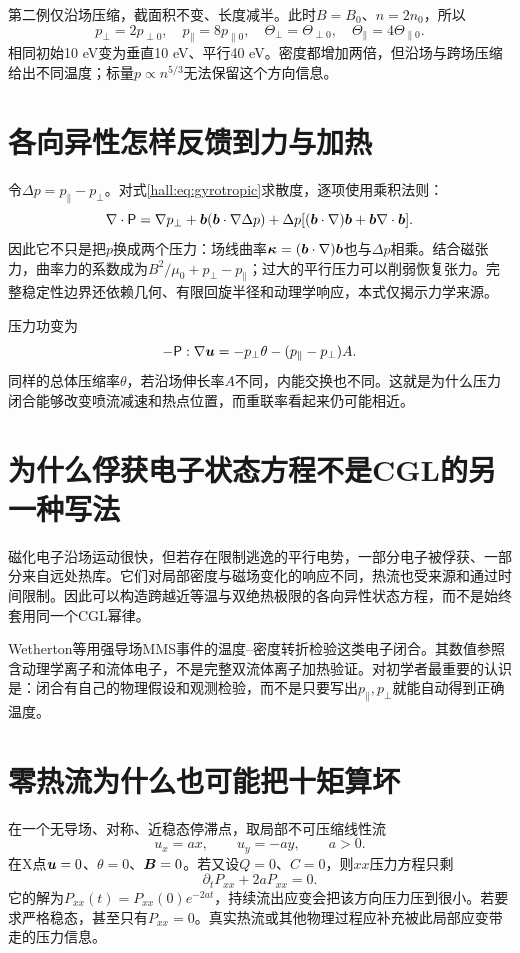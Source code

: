 第二例仅沿场压缩，截面积不变、长度减半。此时$B=B_0$、$n=2n_0$，所以
\begin{equation}
p_\perp=2p_{\perp0},\quad p_\parallel=8p_{\parallel0},\quad
\Theta_\perp=\Theta_{\perp0},\quad\Theta_\parallel=4\Theta_{\parallel0}.
\end{equation}
相同初始10 eV变为垂直10 eV、平行40 eV。密度都增加两倍，但沿场与跨场压缩给出不同温度；标量$p\propto n^{5/3}$无法保留这个方向信息。

\section{各向异性怎样反馈到力与加热}
令$\Delta p=p_\parallel-p_\perp$。对式\eqref{hall:eq:gyrotropic}求散度，逐项使用乘积法则：
\begin{equation}
\nabla\cdot\mathsf P=\nabla p_\perp
+\bm{b}(\bm{b}\cdot\nabla\Delta p)
+\Delta p[(\bm{b}\cdot\nabla)\bm{b}+\bm{b}\nabla\cdot\bm{b}].
\end{equation}
因此它不只是把$p$换成两个压力：场线曲率$\bm{\kappa}=(\bm{b}\cdot\nabla)\bm{b}$也与$\Delta p$相乘。结合磁张力，曲率力的系数成为$B^2/\mu_0+p_\perp-p_\parallel$；过大的平行压力可以削弱恢复张力。完整稳定性边界还依赖几何、有限回旋半径和动理学响应，本式仅揭示力学来源。

压力功变为
\begin{equation}
-\mathsf P:\nabla\bm{u}=-p_\perp\theta-(p_\parallel-p_\perp)A.
\end{equation}
同样的总体压缩率$\theta$，若沿场伸长率$A$不同，内能交换也不同。这就是为什么压力闭合能够改变喷流减速和热点位置，而重联率看起来仍可能相近。

\section{为什么俘获电子状态方程不是CGL的另一种写法}
磁化电子沿场运动很快，但若存在限制逃逸的平行电势，一部分电子被俘获、一部分来自远处热库。它们对局部密度与磁场变化的响应不同，热流也受来源和通过时间限制。因此可以构造跨越近等温与双绝热极限的各向异性状态方程，而不是始终套用同一个CGL幂律。

Wetherton等用强导场MMS事件的温度--密度转折检验这类电子闭合。其数值参照含动理学离子和流体电子，不是完整双流体离子加热验证。对初学者最重要的认识是：闭合有自己的物理假设和观测检验，而不是只要写出$p_\parallel,p_\perp$就能自动得到正确温度。\citep{Wetherton2019}

\section{零热流为什么也可能把十矩算坏}
在一个无导场、对称、近稳态停滞点，取局部不可压缩线性流
\begin{equation}
u_x=ax,\qquad u_y=-ay,\qquad a>0.
\end{equation}
在X点$\bm{u}=0$、$\theta=0$、$\bm{B}=0$。若又设$Q=0$、$C=0$，则$xx$压力方程只剩
\begin{equation}
\partial_tP_{xx}+2aP_{xx}=0.
\end{equation}
它的解为$P_{xx}(t)=P_{xx}(0)e^{-2at}$，持续流出应变会把该方向压力压到很小。若要求严格稳态，甚至只有$P_{xx}=0$。真实热流或其他物理过程应补充被此局部应变带走的压力信息。

